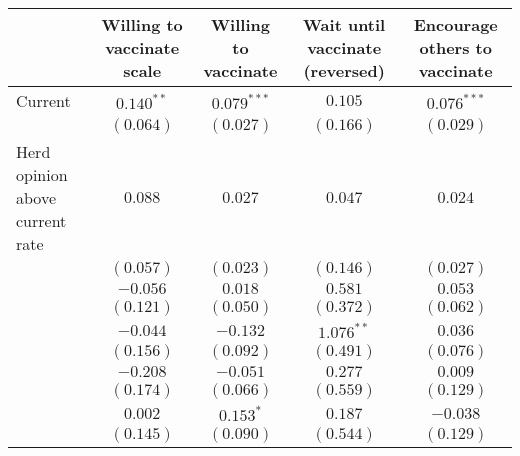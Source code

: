\begin{table}
\begin{center}
\begin{tabular}{l c c c c}
\hline
 & Willing to vaccinate scale & Willing to vaccinate & Wait until vaccinate (reversed) & Encourage others to vaccinate \\
\hline
Current                                          & $0.140^{**}$                 & $0.079^{***}$  & $0.105$                       & $0.076^{***}$  \\
                                                 & $(0.064)$                    & $(0.027)$      & $(0.166)$                     & $(0.029)$      \\
Herd opinion above current rate                  & $0.088$                      & $0.027$        & $0.047$                       & $0.024$        \\
                                                 & $(0.057)$                    & $(0.023)$      & $(0.146)$                     & $(0.027)$      \\
                                                 & $-0.056$                     & $0.018$        & $0.581$                       & $0.053$        \\
                                                 & $(0.121)$                    & $(0.050)$      & $(0.372)$                     & $(0.062)$      \\
                                                 & $-0.044$                     & $-0.132$       & $1.076^{**}$                  & $0.036$        \\
                                                 & $(0.156)$                    & $(0.092)$      & $(0.491)$                     & $(0.076)$      \\
                                                 & $-0.208$                     & $-0.051$       & $0.277$                       & $0.009$        \\
                                                 & $(0.174)$                    & $(0.066)$      & $(0.559)$                     & $(0.129)$      \\
                                                 & $0.002$                      & $0.153^{*}$    & $0.187$                       & $-0.038$       \\
                                                 & $(0.145)$                    & $(0.090)$      & $(0.544)$                     & $(0.129)$      \\

\end{tabular}
\end{center}
\end{table}

